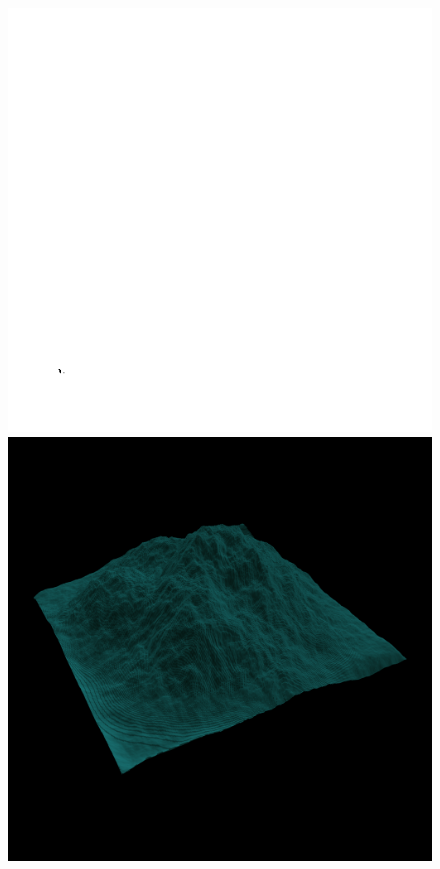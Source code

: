 	\begin{figure}[H]
	  \centering
	  \includegraphics[width=\imagewidth]{images/results/terrains/512-1/perlin/240}
	  \includegraphics[width=\imagewidth]{images/results/terrains/512-1/perlin/240_3d}

\end{figure}
